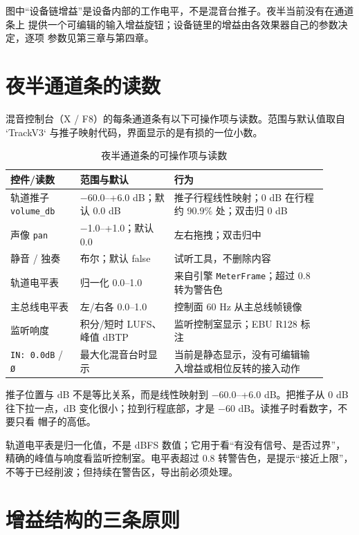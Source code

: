 图中“设备链增益”是设备内部的工作电平，不是混音台推子。夜半当前没有在通道条上
提供一个可编辑的输入增益旋钮；设备链里的增益由各效果器自己的参数决定，逐项
参数见第三章与第四章。

\section{夜半通道条的读数}

混音控制台（X / F8）的每条通道条有以下可操作项与读数。范围与默认值取自
`TrackV3` 与推子映射代码，界面显示的是有损的一位小数。

\begin{table}[htbp]
\centering
\small
\begin{tabular}{@{}p{0.20\linewidth}p{0.27\linewidth}p{0.44\linewidth}@{}}
\hline
控件/读数 & 范围与默认 & 行为 \\
\hline
轨道推子 \texttt{volume\_db} & −60.0–+6.0 dB；默认 0.0 dB & 推子行程线性映射；0 dB 在行程约 90.9\% 处；双击归 0 dB \\
声像 \texttt{pan} & −1.0–+1.0；默认 0.0 & 左右拖拽；双击归中 \\
静音 / 独奏 & 布尔；默认 false & 试听工具，不删除内容 \\
轨道电平表 & 归一化 0.0–1.0 & 来自引擎 \texttt{MeterFrame}；超过 0.8 转为警告色 \\
主总线电平表 & 左/右各 0.0–1.0 & 控制面 60 Hz 从主总线帧镜像 \\
监听响度 & 积分/短时 LUFS、峰值 dBTP & 监听控制室显示；EBU R128 标注 \\
\texttt{IN: 0.0dB} / \texttt{Ø} & 最大化混音台时显示 & 当前是静态显示，没有可编辑输入增益或相位反转的接入动作 \\
\hline
\end{tabular}
\caption{夜半通道条的可操作项与读数}
\label{tab:channel-strip-readings}
\end{table}


推子位置与 dB 不是等比关系，而是线性映射到 −60.0–+6.0 dB。把推子从 0 dB
往下拉一点，dB 变化很小；拉到行程底部，才是 −60 dB。读推子时看数字，不要只看
帽子的高低。

轨道电平表是归一化值，不是 dBFS 数值；它用于看“有没有信号、是否过界”，
精确的峰值与响度看监听控制室。电平表超过 0.8 转警告色，是提示“接近上限”，
不等于已经削波；但持续在警告区，导出前必须处理。

\section{增益结构的三条原则}

